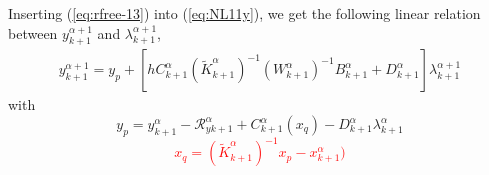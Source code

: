 Inserting (\ref{eq:rfree-13}) into (\ref{eq:NL11y}), we get the following linear relation between $y^{\alpha+1}_{k+1}$ and $\lambda^{\alpha+1}_{k+1}$, 
\begin{equation}
   \begin{array}{l}
 y^{\alpha+1}_{k+1} = y_p + \left[ h  C^{\alpha}_{k+1} (\tilde K^{\alpha}_{k+1})^{-1}( W^{\alpha}_{k+1})^{-1}  B^{\alpha}_{k+1} + D^{\alpha}_{k+1} \right]\lambda^{\alpha+1}_{k+1}
   \end{array}
\end{equation}
with 
\begin{equation}\boxed{
y_p = y^{\alpha}_{k+1} -\mathcal R^{\alpha}_{yk+1} + C^{\alpha}_{k+1}(x_q) -
D^{\alpha}_{k+1} \lambda^{\alpha}_{k+1} }
\end{equation}
\textcolor{red}{
  \begin{equation}
   \boxed{ x_q=(\tilde K^{\alpha}_{k+1})^{-1}x_p -x^{\alpha}_{k+1})\label{eq:xqq}}
  \end{equation}
}











